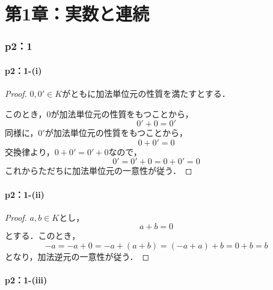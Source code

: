 \documentclass[a4paper,10pt,fleqn]{ltjsarticle}
\begin{document}
\part*{第1章：実数と連続}

\section*{p2：1}


\subsection*{p2：1-(i)}

\begin{leftbar}
    \begin{proof}
        $0,0' \in K$がともに加法単位元の性質を満たすとする．

        このとき，$0$が加法単位元の性質をもつことから，
        \[
            0'+0=0'
        \]
        同様に，$0'$が加法単位元の性質をもつことから，
        \[
            0+0' = 0
        \]
        交換律より，$0+0'=0'+0$なので，
        \[
            0'=0'+0 =0+0' =0
        \]
        これからただちに加法単位元の一意性が従う．
    \end{proof}
\end{leftbar}

\subsection*{p2：1-(ii)}

\begin{leftbar}
    \begin{proof}
        $a ,b \in K$とし，
        \[
            a+b =0
        \]
        とする．このとき，
        \[
            -a = -a+0 = -a +(a+b)=(-a+a)+b =0+b = b
        \]
        となり，加法逆元の一意性が従う．
    \end{proof}
\end{leftbar}

\subsection*{p2：1-(iii)}
\end{document}
